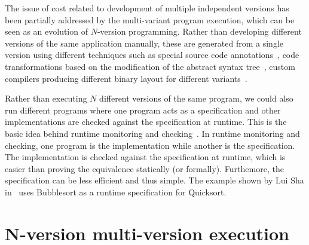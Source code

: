 The issue of cost related to development of multiple independent versions has
been partially addressed by the multi-variant program execution, which can be seen
as an evolution of $N$-version programming. Rather than developing different versions
of the same application manually, these are generated from a single version
using different techniques such as special source code
annotations~\cite{onlinevalidation,trachsel10}, code transformations based on
the modification of the abstract syntax tree~\cite{schulte14,sosie:issta14},
custom compilers producing different binary layout for different
variants~\cite{orchestra09,unibus:nspw10}. %

Rather than executing $N$ different versions of the same program, we could also
run different programs where one program acts as a specification and other
implementations are checked against the specification at runtime.  This is the
basic idea behind runtime monitoring and checking~\cite{kim:mac,java-mac01}. In
runtime monitoring and checking, one program is the implementation while
another is the specification. The implementation is checked against the
specification at runtime, which is easier than proving the equivalence
statically (or formally).  Furthemore, the specification can be less efficient
and thus simple. The example shown by Lui Sha in~\cite{lui01} uses Bubblesort
as a runtime specification for Quicksort.


\section{N-version \vs multi-version execution}


